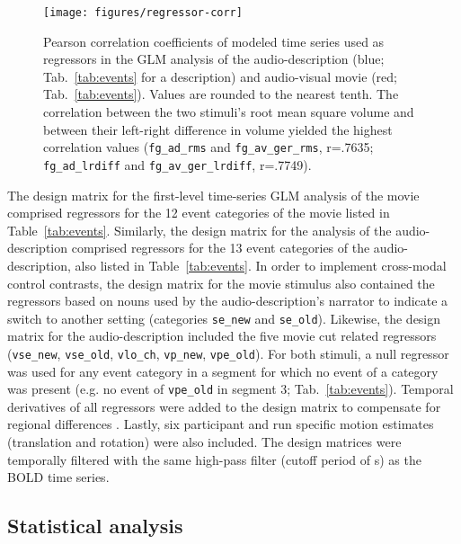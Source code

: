 \documentclass[english]{article}
\begin{document}
\begin{figure*}[tbp]
\centering
    \texttt{[image: figures/regressor-corr]} \caption{Pearson
        correlation coefficients of modeled time series used as regressors in
        the GLM analysis of the
        audio-description (blue; Tab.~\ref{tab:events} for a
        description) and audio-visual movie (red; Tab.~\ref{tab:events}).
        Values are rounded to the nearest tenth.
        The correlation between the two stimuli's
        root mean square volume and between their left-right difference in
        volume yielded the highest correlation values
        (\texttt{fg\_ad\_rms} and \texttt{fg\_av\_ger\_rms}, r=.7635;
        \texttt{fg\_ad\_lrdiff} and \texttt{fg\_av\_ger\_lrdiff}, r=.7749).
      }
\label{fig:reg-corr}
\end{figure*}


The design matrix for the first-level time-series GLM analysis of the movie
comprised regressors for the 12 event categories of the movie listed in
Table~\ref{tab:events}.
Similarly, the design matrix for the analysis of the audio-description comprised
regressors for the 13 event categories of the audio-description, also listed in
Table~\ref{tab:events}.
In order to implement cross-modal control contrasts, the design matrix for the
movie stimulus also contained the regressors based on nouns used by the
audio-description's narrator to indicate a switch to another setting (categories
\texttt{se\_new} and \texttt{se\_old}).
Likewise, the design matrix for the audio-description included the five movie
cut related regressors (\texttt{vse\_new}, \texttt{vse\_old}, \texttt{vlo\_ch},
\texttt{vp\_new}, \texttt{vpe\_old}).
For both stimuli, a null regressor was used for any event category in a segment
for which no event of a category was present (e.g. no event of \texttt{vpe\_old}
in segment 3; Tab.~\ref{tab:events}).
Temporal derivatives of all regressors were added to the design matrix to
compensate for regional differences \citep{friston1998event}.
Lastly, six participant and run specific motion estimates (translation and
rotation) were also included.
The design matrices were temporally filtered with the same high-pass filter
(cutoff period of \unit[150]{s}) as the BOLD time series.


\subsection{Statistical analysis}
\end{document}
